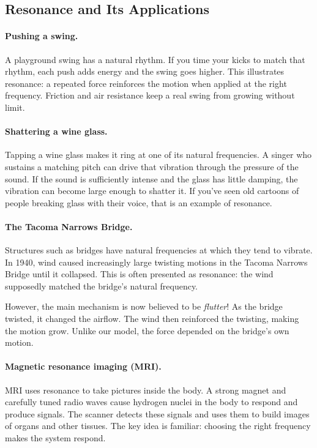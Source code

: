 \documentclass[10pt,letterpaper]{article}
\begin{document}
\subsection{Resonance and Its Applications}

\paragraph{Pushing a swing.}
A playground swing has a natural rhythm. If you time your kicks
to match that rhythm, each push adds energy and the
swing goes higher. This illustrates resonance:
a repeated force reinforces the motion when applied
at the right frequency. Friction and air resistance
keep a real swing from growing without limit.

\paragraph{Shattering a wine glass.}
Tapping a wine glass makes it ring at one of its natural
frequencies. A singer who sustains a matching pitch can
drive that vibration through the pressure of the sound.
If the sound is sufficiently intense and the glass
has little damping, the vibration can become large
enough to shatter it. If you've seen old cartoons of people breaking glass with their voice, that is an example of resonance.

\paragraph{The Tacoma Narrows Bridge.}
Structures such as bridges have natural frequencies
at which they tend to vibrate. In 1940, wind caused
increasingly large twisting motions in the Tacoma
Narrows Bridge until it collapsed. This is often
presented as resonance: the wind supposedly matched
the bridge's natural frequency.

However, the main mechanism is now believed to be \textit{flutter}!
As the bridge twisted, it changed the airflow.
The wind then reinforced the twisting, making the
motion grow. Unlike our model, the force depended
on the bridge's own motion.

\paragraph{Magnetic resonance imaging (MRI).}
MRI uses resonance to take pictures inside the body.
A strong magnet and carefully tuned radio waves cause
hydrogen nuclei in the body to respond and produce
signals. The scanner detects these signals and uses
them to build images of organs and other tissues.
The key idea is familiar: choosing the right frequency
makes the system respond.
\end{document}
